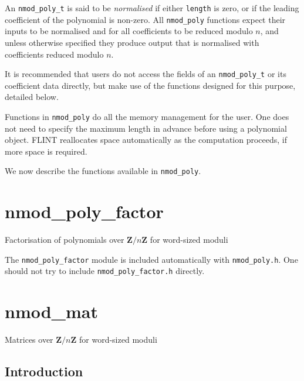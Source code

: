 \documentclass[a4paper,10pt]{book}
\newcommand{\Z}{\mathbf{Z}}%
\newcommand{\code}{\lstinline}
\begin{document}
{{An \code{nmod_poly_t} is said to be \emph{normalised} if either
\code{length} is zero, or if the leading coefficient of the polynomial is
non-zero.  All \code{nmod_poly} functions expect their inputs to be
normalised and for all coefficients to be reduced modulo $n$, and unless
otherwise specified they produce output that is normalised with
coefficients reduced modulo $n$.

It is recommended that users do not access the fields of an
\code{nmod_poly_t} or its coefficient data directly, but make use of the
functions designed for this purpose, detailed below.

Functions in \code{nmod_poly} do all the memory management for the user.
One does not need to specify the maximum length in advance before using a
polynomial object.  FLINT reallocates space automatically as the computation
proceeds, if more space is required.

We now describe the functions available in \code{nmod_poly}.




\chapter{nmod\_poly\_factor}
\epigraph{Factorisation of polynomials over $\Z / n \Z$ for word-sized moduli}{}

The \code{nmod_poly_factor} module is included automatically with
\code{nmod_poly.h}. One should not try to include \code{nmod_poly_factor.h}
directly.




\chapter{nmod\_mat}
\epigraph{Matrices over $\Z / n \Z$ for word-sized moduli}{}

\section{Introduction}

}}
\end{document}
